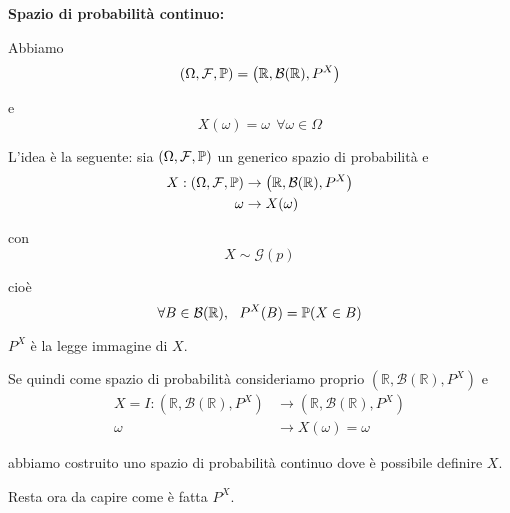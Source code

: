 \begin{enumerate}
\textbf{Spazio di probabilità continuo:}

Abbiamo
\begin{equation*}
( \Omega ,\mathcal{F} ,\mathbb{P}) =\left(\mathbb{R} ,\mathcal{B}(\mathbb{R}) ,P^{X}\right)
\end{equation*}

e
\begin{equation*}
X( \omega ) =\omega \ \ \forall \omega \in \Omega 
\end{equation*}

L'idea è la seguente: sia $( \Omega ,\mathcal{F} ,\mathbb{P})$ un generico spazio di probabilità e
\begin{align*}
X:( \Omega ,\mathcal{F} ,\mathbb{P}) & \rightarrow \left(\mathbb{R} ,\mathcal{B}(\mathbb{R}) ,P^{X}\right)\\
\omega  & \rightarrow X( \omega )
\end{align*}

con
\begin{equation*}
X\sim \mathcal{G}( p)
\end{equation*}

cioè\begin{equation*}
\forall B\in \mathcal{B}(\mathbb{R}) ,\ \ P^{X}( B) =\mathbb{P}( X\in B)
\end{equation*}

$P^{X}$ è la legge immagine di $X$.

Se quindi come spazio di probabilità consideriamo proprio $\left(\mathbb{R} ,\mathcal{B}(\mathbb{R}) ,P^{X}\right)$ e
\begin{align*}
X=I:\left(\mathbb{R} ,\mathcal{B}(\mathbb{R}) ,P^{X}\right) & \rightarrow \left(\mathbb{R} ,\mathcal{B}(\mathbb{R}) ,P^{X}\right)\\
\omega  & \rightarrow X( \omega ) =\omega 
\end{align*}

abbiamo costruito uno spazio di probabilità continuo dove è possibile definire $X$.

Resta ora da capire come è fatta $P^{X}$.
\end{enumerate}
